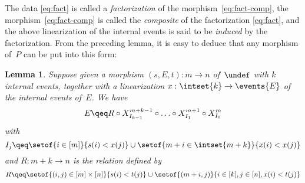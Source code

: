 \documentclass[submission,copyright,creativecommons]{eptcs}
\let\P\undef
\newtheorem{lemma}[theorem]{Lemma}
\theoremstyle{definition}
\theoremstyle{remark}
\begin{document}
\noindent
The data \eqref{eq:fact} is called a \emph{factorization} of the
morphism~\eqref{eq:fact-comp}, the morphism~\eqref{eq:fact-comp} is called the
\emph{composite} of the factorization \eqref{eq:fact}, and the above
linearization of the internal events is said to be \emph{induced} by the
factorization. From the preceding lemma, it is easy to deduce that any morphism
of~$P$ can be put into this form:

\begin{lemma}
  \label{lemma:poset-cf-fact}
  Suppose given a morphism $(s,E,t):m\to n$ of~$\P$ with $k$ internal events,
  together with a linearization $x:\intset{k}\to\events{E}$ of the internal
  events of~$E$. We have
  \begin{equation}
    \label{eq:poset-fact}
    E \qeq R\circ X^{m+k-1}_{I_{k-1}}\circ\ldots\circ X^{m+1}_{I_1}\circ X^m_{I_0}
  \end{equation}
  with
  \[
  I_j\qeq\setof{i\in[m]}{s(i)<x(j)}\cup\setof{m+i\in\intset{m+k}}{x(i)<x(j)}
  \]
  and $R:m+k\to n$ is the relation defined by
  \[
  R\qeq \setof{(i,j)\in[m]\times[n]}{s(i)<t(j)}\cup\setof{(m+i,j)}{i\in[k],j\in[n], x(i)<t(j)}
  \]
\end{lemma}
\end{document}
